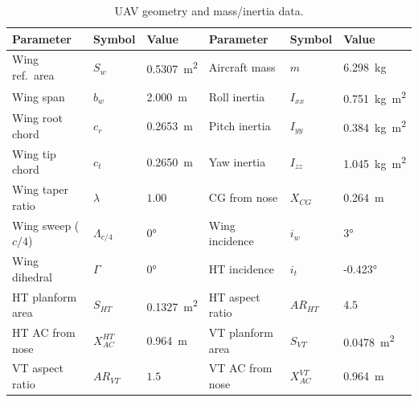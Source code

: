 \begin{table}[H]
  \centering
  \caption{UAV geometry and mass/inertia data.}
  \label{tab:geometry}
  \begin{tabular}{lll lll}
    \toprule
    \textbf{Parameter} & \textbf{Symbol} & \textbf{Value}
    & \textbf{Parameter} & \textbf{Symbol} & \textbf{Value} \\
    \midrule
    Wing ref.\ area        & $S_w$          & \SI{0.5307}{m^2}
    & Aircraft mass        & $m$            & \SI{6.298}{kg}  \\
    Wing span              & $b_w$          & \SI{2.000}{m}
    & Roll inertia         & $I_{xx}$       & \SI{0.751}{kg.m^2} \\
    Wing root chord        & $c_r$          & \SI{0.2653}{m}
    & Pitch inertia        & $I_{yy}$       & \SI{0.384}{kg.m^2} \\
    Wing tip chord         & $c_t$          & \SI{0.2650}{m}
    & Yaw inertia          & $I_{zz}$       & \SI{1.045}{kg.m^2} \\
    Wing taper ratio       & $\lambda$      & $1.00$
    & CG from nose         & $X_{CG}$       & \SI{0.264}{m}  \\
    Wing sweep ($c/4$)     & $\Lambda_{c/4}$& \ang{0}
    & Wing incidence       & $i_w$          & \ang{3}        \\
    Wing dihedral          & $\Gamma$       & \ang{0}
    & HT incidence         & $i_t$          & \ang{-0.423}   \\
    HT planform area       & $S_{HT}$       & \SI{0.1327}{m^2}
    & HT aspect ratio      & $AR_{HT}$      & $4.5$          \\
    HT AC from nose        & $X_{AC}^{HT}$  & \SI{0.964}{m}
    & VT planform area     & $S_{VT}$       & \SI{0.0478}{m^2}  \\
    VT aspect ratio        & $AR_{VT}$      & $1.5$
    & VT AC from nose      & $X_{AC}^{VT}$  & \SI{0.964}{m}  \\
    \bottomrule
  \end{tabular}
\end{table}

